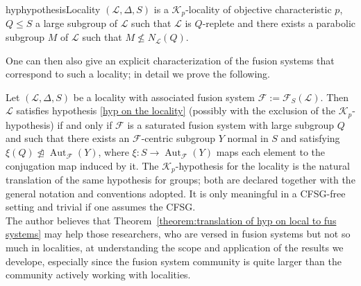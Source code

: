 \documentclass{amsart}
\numberwithin{equation}{section}
\theoremstyle{definition}
\theoremstyle{subresult}
\theoremstyle{caseresult}
\newcounter{maintheorem}
\renewcommand{\themaintheorem}{}
\newenvironment{maintheorem}[1]
{%
	\def\customname{#1}%
	\renewcommand{\themaintheorem}{\customname}%
	\refstepcounter{maintheorem}%
	\trivlist
	\item[\hskip\labelsep\bfseries Theorem~\themaintheorem.]%
	\itshape
}
{%
	\endtrivlist
}
\newcommand{\F}{\mathcal{F}}
\renewcommand{\L}{\mathcal{L}}
\newcommand{\K}{\mathcal{K}}
\newcommand{\Aut}{\operatorname{Aut}}
\newcommand{\norm}{\trianglelefteq}
\newcommand{\fto}{\longrightarrow}
\newcommand{\<}{\langle}
\renewcommand{\>}{\rangle}
\begin{document}
\begin{restatable}{hyp}{hypothesisLocality} \label{hyp on the locality}
	$(\L,\Delta,S)$ is a $\K_p$-locality of objective characteristic $p$, $Q \le S$ a large subgroup of $\L$ such that $\L$ is $Q$-replete and there exists a parabolic subgroup $M$ of $\L$ such that $M \not \le N_\L(Q)$.
\end{restatable}

One can then also give an explicit characterization of the fusion systems that correspond to such a locality; in detail we prove the following.

\begin{maintheorem}{B}
	\label{theorem:translation of hyp on local to fus systems}
	Let $(\L,\Delta,S)$ be a locality with associated fusion system $\F:=\F_S(\L)$. Then $\L$ satisfies hypothesis \ref{hyp on the locality} (possibly with the exclusion of the $\K_p$-hypothesis) if and only if $\F$ is a saturated fusion system with large subgroup $Q$ and such that there exists an $\F$-centric subgroup $Y$ normal in $S$ and satisfying $\xi(Q) \not \norm \Aut_\F(Y)$, where $\xi \colon S \fto \Aut_\F(Y)$ maps each element to the conjugation map induced by it.
\end{maintheorem}
The $\K_p$-hypothesis for the locality is the natural translation of the same hypothesis for groups; both are declared together with the general notation and conventions adopted. It is only meaningful in a CFSG-free setting and trivial if one assumes the CFSG.\\
The author believes that Theorem~\ref{theorem:translation of hyp on local to fus systems} may help those researchers, who are versed in fusion systems but not so much in localities, at understanding the scope and application of the results we develope, especially since the fusion system community is quite larger than the community actively working with localities.\\
\end{document}
